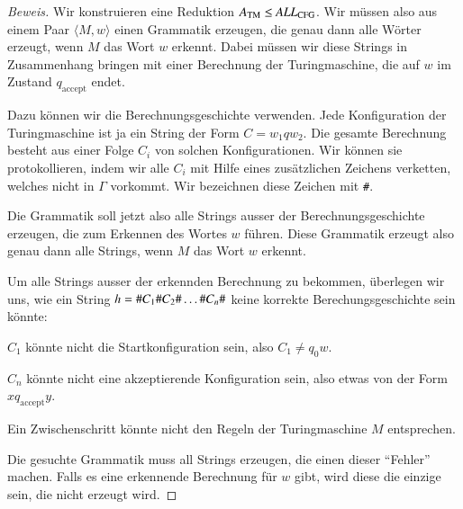\begin{proof}[Beweis]
Wir konstruieren eine Reduktion 
$A_{\text{TM}}\le \text{\it ALL}_{\text{CFG}}$.
Wir müssen also aus einem Paar $\langle M,w\rangle$ einen
Grammatik erzeugen, die genau dann alle Wörter erzeugt, wenn
$M$ das Wort $w$ erkennt.
Dabei müssen wir diese Strings in
Zusammenhang bringen mit einer Berechnung der Turingmaschine, die
auf $w$ im Zustand $q_{\text{accept}}$ endet.

Dazu können wir
die Berechnungsgeschichte verwenden.
Jede Konfiguration der
Turingmaschine ist ja ein String der Form $C=w_1qw_2$.
Die gesamte
Berechnung besteht aus einer Folge $C_i$ von solchen Konfigurationen.
Wir können sie protokollieren, indem wir alle $C_i$
mit Hilfe eines zusätzlichen Zeichens verketten,
welches nicht in $\Gamma$ vorkommt.
Wir bezeichnen diese Zeichen
mit {\tt\#}.

Die Grammatik soll jetzt also alle Strings ausser der Berechnungsgeschichte
erzeugen, die zum Erkennen des Wortes $w$ führen.
Diese Grammatik
erzeugt also genau dann alle Strings, wenn $M$ das Wort $w$ erkennt.

Um alle Strings ausser der erkennden Berechnung zu bekommen,
überlegen wir uns, wie ein String
$h={\tt\#}C_1{\tt\#}C_2{\tt\#}\dots{\tt\#}C_n{\tt\#}$
keine korrekte Berechungsgeschichte sein könnte:
\medskip
\begin{compactenum}
\item $C_1$ könnte nicht die Startkonfiguration sein, also
$C_1\ne q_0w$.
\item $C_n$ könnte nicht eine akzeptierende Konfiguration 
sein, also etwas von der Form $xq_{\text{accept}}y$.
\item Ein Zwischenschritt könnte nicht den Regeln der Turingmaschine
$M$ entsprechen.
\end{compactenum}
\medskip
Die gesuchte Grammatik muss all Strings erzeugen, die einen dieser ``Fehler''
machen.
Falls es eine erkennende Berechnung für $w$ gibt, wird diese
die einzige sein, die nicht erzeugt wird.


\end{proof}
